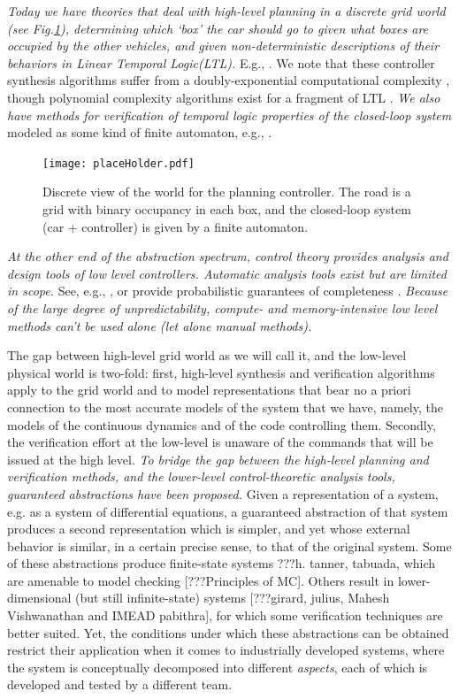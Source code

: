 {\it Today we have theories that deal with \emph{high-level planning in a discrete grid world} (see Fig.\ref{fig:discreteview}), determining which `box' the car should go to given what boxes are occupied by the other vehicles, and given non-deterministic descriptions of their behaviors in Linear Temporal Logic(LTL).
}
E.g., \cite{WongpiromsarnTM10hscc,RamanK13_ImpossibleBehaviors}.
We note that these controller synthesis algorithms suffer from a doubly-exponential computational complexity \cite{PnueliR89}, though polynomial complexity algorithms exist for a fragment of LTL \cite{KleinP10_RevisitingGR1}.
{\it We also have methods for verification of temporal logic properties of the closed-loop system} modeled as some kind of finite automaton, e.g., \cite{Bouyer06latin}.
\begin{figure}[tb]
	\label{fig:discreteview}
	\texttt{[image: placeHolder.pdf]}
	\caption{Discrete view of the world for the planning controller. The road is a grid with binary occupancy in each box, and the closed-loop system (car + controller) is given by a finite automaton.}
\end{figure}
{\it At the other end of the abstraction spectrum, control theory provides analysis and design tools of low level controllers. Automatic analysis tools exist \cite{KloetzerB08tac} but are limited in scope.}
See, e.g., , or provide probabilistic guarantees of completeness .
{\it Because of the large degree of unpredictability, compute- and memory-intensive low level methods can't be used alone (let alone manual methods). }

The gap between high-level grid world as we will call it, and the low-level physical world is two-fold:
first, high-level synthesis and verification algorithms apply to the grid world  and to model representations that bear no a priori connection to the most accurate models of the system that we have, namely, the models of the continuous dynamics and of the code controlling them.
Secondly, the verification effort at the low-level is unaware of the commands that will be issued at the high level. 
{\it To bridge the gap between the high-level planning and verification methods, and the lower-level control-theoretic analysis tools, guaranteed abstractions have been proposed.}
Given a representation of a system, e.g. as a system of differential equations, a guaranteed abstraction of that system produces a second representation which is simpler, and yet whose external behavior is similar, in a certain precise sense, to that of the original system.
Some of these abstractions produce finite-state systems ???h. tanner, tabuada, which are amenable to model checking [???Principles of MC]. 
Others result in lower-dimensional (but still infinite-state) systems [???girard, julius, Mahesh Vishwanathan and IMEAD pabithra], for which some verification techniques are better suited.
Yet, the conditions under which these abstractions can be obtained restrict their application when it comes to industrially developed systems, where the system is conceptually decomposed into different \emph{aspects}, each of which is developed and tested by a different team.


